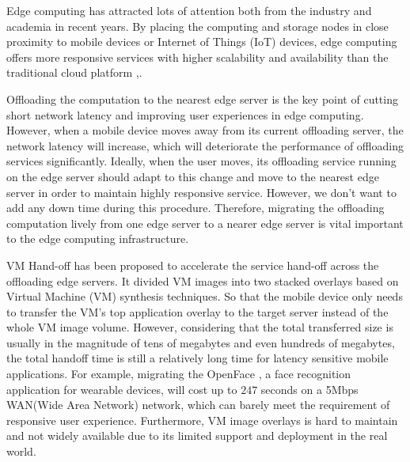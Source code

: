 


Edge computing has attracted lots of attention both from the industry and academia in recent years\cite{satya2009case,  MEC2014initiative, MEC2015-5G, yi2015fog,yi2015survey, satya2017edge}.
By placing the computing and storage nodes in close proximity to mobile devices or Internet of Things (IoT) devices, edge computing offers more responsive services with higher scalability and availability than the traditional cloud platform \cite{MEC2014initiative},\cite{satya2017edge}.

Offloading the computation to the nearest edge server is the key point of cutting short network latency and improving user experiences in edge computing. 
However, when a mobile device moves away from its current offloading server, the network latency will increase, which will deteriorate the performance of offloading services significantly. Ideally, when the user moves, its offloading service running on the edge server should adapt to this change and move to the nearest edge server in order to maintain highly responsive service. However, we don't want to add any down time during this procedure.
Therefore, migrating the offloading computation lively from one edge server to a nearer edge server is vital important to the edge computing infrastructure. 

VM Hand-off \cite{ha2015vmhandoff} has been proposed to accelerate the service hand-off across the offloading edge servers. It divided VM images into two stacked overlays based on Virtual Machine (VM) synthesis \cite{satya2009case} techniques. %
So that the mobile device only needs to transfer the VM's top application overlay to the target server instead of the whole VM image volume. However, considering that the total transferred size is usually in the magnitude of tens of megabytes and even hundreds of megabytes, the total handoff time is still a relatively long time for latency sensitive mobile applications. For example, migrating the OpenFace \cite{openface2016}, a face recognition application for wearable devices, will cost up to $247$ seconds on a 5Mbps WAN(Wide Area Network) network, which can barely meet the requirement of responsive user experience. 
Furthermore, VM image overlays is hard to maintain and not widely available due to its limited support and deployment in the real world.


